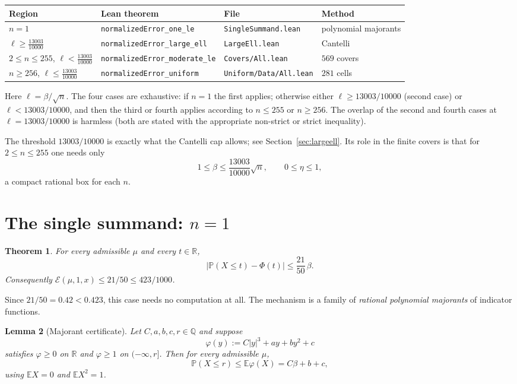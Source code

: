 \documentclass[11pt,a4paper]{article}
\newtheorem{theorem}{Theorem}[section]
\newtheorem{lemma}[theorem]{Lemma}
\theoremstyle{definition}
\newcommand{\RR}{\mathbb{R}}
\newcommand{\QQ}{\mathbb{Q}}
\newcommand{\EE}{\mathbb{E}}
\newcommand{\PP}{\mathbb{P}}
\newcommand{\Lean}[1]{\texttt{#1}}
\newcommand{\file}[1]{\texttt{#1}}
\begin{document}
\begin{center}
\footnotesize
\setlength{\tabcolsep}{4pt}
\begin{tabular}{llll}
  \toprule
  Region & Lean theorem & File & Method\\
  \midrule
  $n=1$ & \Lean{normalizedError\_one\_le} & \file{SingleSummand.lean} & polynomial majorants\\
  $\ell\ge\frac{13003}{10000}$ & \Lean{normalizedError\_large\_ell} & \file{LargeEll.lean} & Cantelli\\
  $2\le n\le255$, $\ell<\frac{13003}{10000}$ & \Lean{normalizedError\_moderate\_le} & \file{Covers/All.lean} & $569$ covers\\
  $n\ge256$, $\ell\le\frac{13003}{10000}$ & \Lean{normalizedError\_uniform} & \file{Uniform/Data/All.lean} & $281$ cells\\
  \bottomrule
\end{tabular}
\end{center}

\noindent Here $\ell=\beta/\sqrt n$. The four cases are exhaustive:
if $n=1$ the first applies; otherwise either $\ell\ge13003/10000$ (second case)
or $\ell<13003/10000$, and then the third or fourth applies according to
$n\le255$ or $n\ge256$. The overlap of the second and fourth cases at
$\ell=13003/10000$ is harmless (both are stated with the appropriate non-strict
or strict inequality).

The threshold $13003/10000$ is exactly what the Cantelli cap allows; see
Section~\ref{sec:largeell}. Its role in the finite covers is that for
$2\le n\le255$ one needs only
\[
  1\le\beta\le \frac{13003}{10000}\sqrt n ,\qquad 0\le\eta\le1 ,
\]
a compact rational box for each $n$.

\section{The single summand: $n=1$}
\label{sec:one}

\begin{theorem}
  \label{thm:one}
  For every admissible $\mu$ and every $t\in\RR$,
  \[
    \bigl|\PP(X\le t)-\Phi(t)\bigr|\le\frac{21}{50}\,\beta .
  \]
  Consequently $\mathcal E(\mu,1,x)\le 21/50\le 423/1000$.
\end{theorem}

Since $21/50=0.42<0.423$, this case needs no computation at all. The mechanism is
a family of \emph{rational polynomial majorants} of indicator functions.

\begin{lemma}[Majorant certificate]
  \label{lem:maj}
  Let $C,a,b,c,r\in\QQ$ and suppose
  \[
    \varphi(y):=C|y|^3+ay+by^2+c
  \]
  satisfies $\varphi\ge0$ on $\RR$ and $\varphi\ge1$ on $(-\infty,r]$. Then for
  every admissible $\mu$,
  \[
    \PP(X\le r)\le \EE\varphi(X)= C\beta+b+c ,
  \]
  using $\EE X=0$ and $\EE X^2=1$.
\end{lemma}
\end{document}
